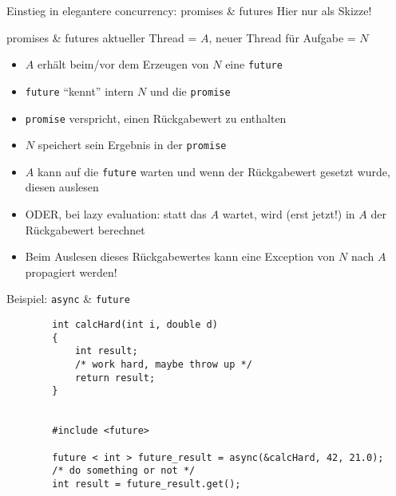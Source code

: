 \begin{frame}{Einstieg in elegantere concurrency: promises \& futures}
	Hier nur als Skizze!
	
	\begin{block}{promises \& futures}
		aktueller Thread = $A$, neuer Thread für Aufgabe = $N$
		\begin{itemize}
			\item $A$ erhält beim/vor dem Erzeugen von $N$ eine \texttt{future}
			\item \texttt{future} \enquote{kennt} intern $N$ und die \texttt{promise}
			\item \texttt{promise} verspricht, einen Rückgabewert zu enthalten
			\item<2-> $N$ speichert sein Ergebnis in der \texttt{promise}
			\item<3-> $A$ kann auf die \texttt{future} warten und wenn der Rückgabewert gesetzt wurde, diesen auslesen
			\item<3-> ODER, bei lazy evaluation: statt das $A$ wartet, wird (erst jetzt!) in $A$ der Rückgabewert berechnet
			\item<4-> Beim Auslesen dieses Rückgabewertes kann eine Exception von $N$ nach $A$ propagiert werden!
		\end{itemize}
	\end{block}
\end{frame}

\begin{frame}[fragile]{ Beispiel: \texttt{async} \& \texttt{future} }
	\begin{lstlisting}
		int calcHard(int i, double d)
		{
			int result;
			/* work hard, maybe throw up */
			return result;
		}
		
		
		#include <future>
		
		future < int > future_result = async(&calcHard, 42, 21.0);
		/* do something or not */
		int result = future_result.get();
	\end{lstlisting}
\end{frame}
